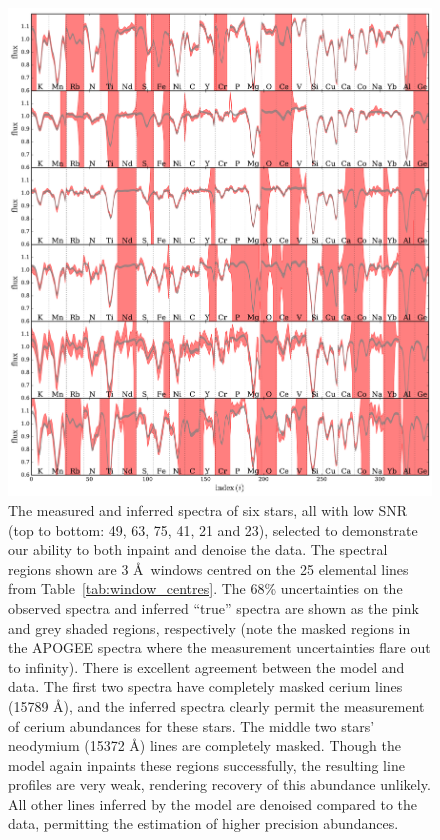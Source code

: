 \documentclass[a4paper,fleqn,usenatbib]{mnras}
\begin{document}
\begin{figure}
	\includegraphics[width=2\columnwidth]{apogee_centers_final_29502_spc_win_wid_1p5_save_spectra.pdf}
    \caption{The measured and inferred spectra of six stars, all with low SNR (top to bottom: 49, 63, 75, 41, 21 and 23), selected to demonstrate our ability to both inpaint and denoise the data. The spectral regions shown are 3 \AA\ windows centred on the 25 elemental lines from Table~\ref{tab:window_centres}. The 68\% uncertainties on the observed spectra and inferred ``true'' spectra are shown as the pink and grey shaded regions, respectively (note the masked regions in the APOGEE spectra where the measurement uncertainties flare out to infinity). There is excellent agreement between the model and data. The first two spectra have completely masked cerium lines (15789 \AA), and the inferred spectra clearly permit the measurement of cerium abundances for these stars. The middle two stars' neodymium (15372 \AA) lines are completely masked. Though the model again inpaints these regions successfully, the resulting line profiles are very weak, rendering recovery of this abundance unlikely. All other lines inferred by the model are denoised compared to the data, permitting the estimation of higher precision abundances.}
    \label{fig:inpainting_denoising_examples}
\end{figure}
\end{document}
